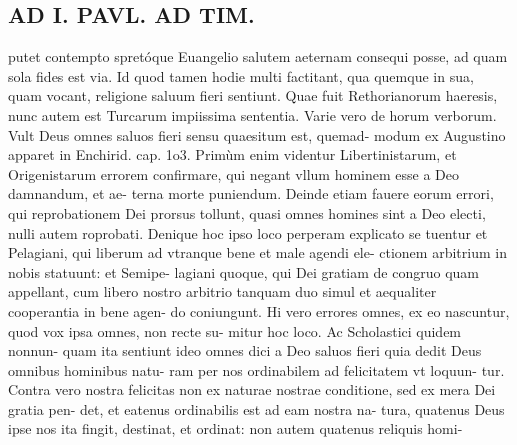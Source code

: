 \documentclass{article}
\begin{document}
\begin{pages}
\section*{AD I. PAVL. AD TIM. }
\marginpar{[ p.54 ]}\pstart putet contempto spretóque Euangelio salutem aeternam consequi posse, ad quam sola fides est via. Id quod tamen hodie multi factitant, qua quemque in sua, quam vocant, religione saluum fieri sentiunt. Quae fuit Rethorianorum haeresis, nunc autem est Turcarum impiissima sententia.  \pend\pstart Varie vero de horum verborum. Vult Deus omnes saluos fieri sensu quaesitum est, quemad- modum ex Augustino apparet in Enchirid. cap. 1o3. Primùm enim videntur Libertinistarum, et Origenistarum errorem confirmare, qui negant vllum hominem esse a Deo damnandum, et ae- terna morte puniendum. Deinde etiam fauere eorum errori, qui reprobationem Dei prorsus tollunt, quasi omnes homines sint a Deo electi, nulli autem roprobati. Denique hoc ipso loco perperam explicato se tuentur et Pelagiani, qui liberum ad vtranque bene et male agendi ele- ctionem arbitrium in nobis statuunt: et Semipe- lagiani quoque, qui Dei gratiam de congruo quam appellant, cum libero nostro arbitrio tanquam duo simul et aequaliter cooperantia in bene agen- do coniungunt. Hi vero errores omnes, ex eo nascuntur, quod vox ipsa omnes, non recte su- mitur hoc loco. Ac Scholastici quidem nonnun- quam ita sentiunt ideo omnes dici a Deo saluos fieri quia dedit Deus omnibus hominibus natu- ram per nos ordinabilem ad felicitatem vt loquun- tur. Contra vero nostra felicitas non ex naturae nostrae conditione, sed ex mera Dei gratia pen- det, et eatenus ordinabilis est ad eam nostra na- tura, quatenus Deus ipse nos ita fingit, destinat, et ordinat: non autem quatenus reliquis homi-  \pend

\end{pages}
\end{document}
